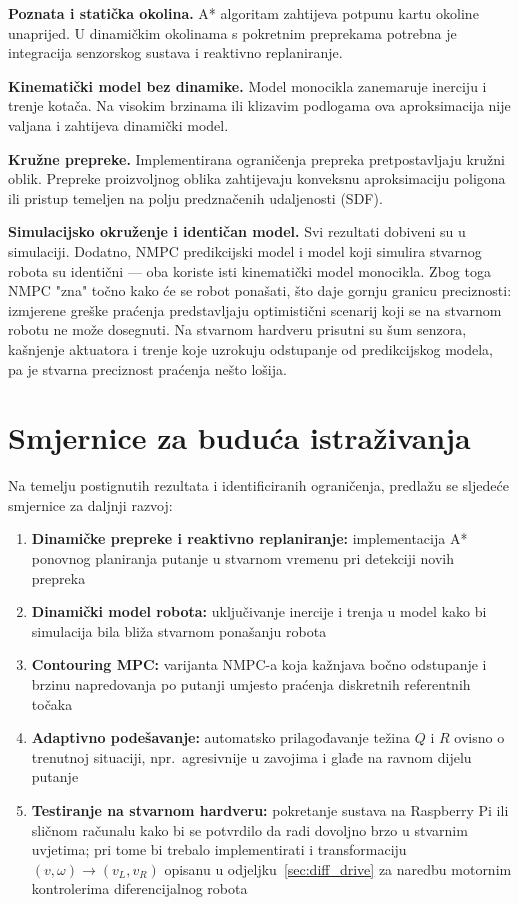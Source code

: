 \textbf{Poznata i statička okolina.} A* algoritam zahtijeva potpunu kartu okoline unaprijed. U dinamičkim okolinama s pokretnim preprekama potrebna je integracija senzorskog sustava i reaktivno replaniranje.

\textbf{Kinematički model bez dinamike.} Model monocikla zanemaruje inerciju i trenje kotača. Na visokim brzinama ili klizavim podlogama ova aproksimacija nije valjana i zahtijeva dinamički model.

\textbf{Kružne prepreke.} Implementirana ograničenja prepreka pretpostavljaju kružni oblik. Prepreke proizvoljnog oblika zahtijevaju konveksnu aproksimaciju poligona ili pristup temeljen na polju predznačenih udaljenosti (SDF).

\textbf{Simulacijsko okruženje i identičan model.} Svi rezultati dobiveni su u simulaciji. Dodatno, NMPC predikcijski model i model koji simulira stvarnog robota su identični --- oba koriste isti kinematički model monocikla. Zbog toga NMPC "zna" točno kako će se robot ponašati, što daje gornju granicu preciznosti: izmjerene greške praćenja predstavljaju optimistični scenarij koji se na stvarnom robotu ne može dosegnuti. Na stvarnom hardveru prisutni su šum senzora, kašnjenje aktuatora i trenje koje uzrokuju odstupanje od predikcijskog modela, pa je stvarna preciznost praćenja nešto lošija.

\section{Smjernice za buduća istraživanja}

Na temelju postignutih rezultata i identificiranih ograničenja, predlažu se sljedeće smjernice za daljnji razvoj:

\begin{enumerate}
  \item \textbf{Dinamičke prepreke i reaktivno replaniranje:} implementacija A* ponovnog planiranja putanje u stvarnom vremenu pri detekciji novih prepreka
  \item \textbf{Dinamički model robota:} uključivanje inercije i trenja u model kako bi simulacija bila bliža stvarnom ponašanju robota
  \item \textbf{Contouring MPC:} varijanta NMPC-a koja kažnjava bočno odstupanje i brzinu napredovanja po putanji umjesto praćenja diskretnih referentnih točaka
  \item \textbf{Adaptivno podešavanje:} automatsko prilagođavanje težina $Q$ i $R$ ovisno o trenutnoj situaciji, npr.\ agresivnije u zavojima i glađe na ravnom dijelu putanje
  \item \textbf{Testiranje na stvarnom hardveru:} pokretanje sustava na Raspberry Pi ili sličnom računalu kako bi se potvrdilo da radi dovoljno brzo u stvarnim uvjetima; pri tome bi trebalo implementirati i transformaciju $(v, \omega) \to (v_L, v_R)$ opisanu u odjeljku~\ref{sec:diff_drive} za naredbu motornim kontrolerima diferencijalnog robota
\end{enumerate}

